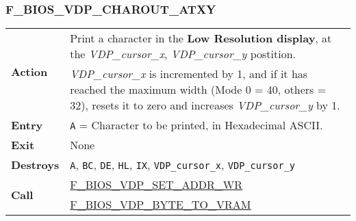         \subsubsection{F\_BIOS\_VDP\_CHAROUT\_ATXY}
        \label{func:fbiosvdpcharoutatxy}
        \begin{tabular}{l p{9cm}}
            \hline\multirow[t]{2}{4em}{\textbf{Action}}
            & Print a character in the \textbf{Low Resolution display}, at the
            \textit{VDP\_cursor\_x}, \textit{VDP\_cursor\_y} postition.\\
            & \textit{VDP\_cursor\_x} is incremented by 1, and if it has reached
            the maximum width (Mode 0 = 40, others = 32), resets it to zero and
            increases \textit{VDP\_cursor\_y} by 1.\\
            \hline\textbf{Entry} & \texttt{A} = Character to be printed, in
            Hexadecimal ASCII.\\
            \hline\textbf{Exit} & None\\
            \hline\textbf{Destroys} & \texttt{A}, \texttt{BC}, \texttt{DE},
            \texttt{HL}, \texttt{IX}, \texttt{VDP\_cursor\_x},
            \texttt{VDP\_cursor\_y}\\
            \hline\multirow[t]{2}{4em}{\textbf{Call}}
            & \hyperref[func:fbiosvdpsetaddrwr]{F\_BIOS\_VDP\_SET\_ADDR\_WR}\\
            & \hyperref[func:fbiosvdpbytetovram]{F\_BIOS\_VDP\_BYTE\_TO\_VRAM}\\
            \hline
        \end{tabular}